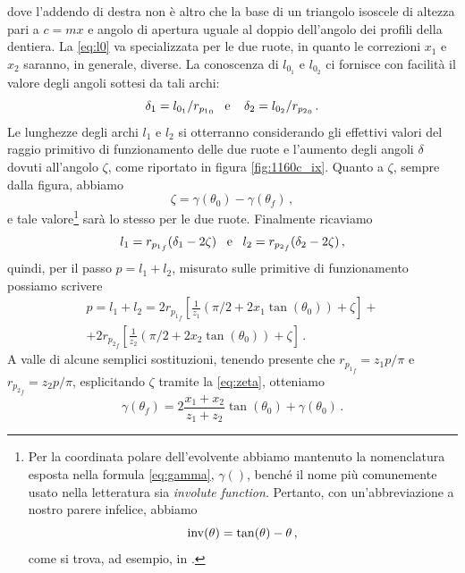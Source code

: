 \noindent dove l'addendo di destra non \`e altro che la base di un triangolo
isoscele di altezza pari a $c=mx$ e angolo di apertura uguale al 
doppio dell'angolo dei profili della dentiera. La \ref{eq:l0} va specializzata
per le due ruote, in quanto le correzioni $x_1$ e $x_2$ saranno,
in generale, 
diverse. La conoscenza di $l_{0_1}$ e $l_{0_2}$ ci fornisce con facilit\`a
il valore degli angoli sottesi da tali archi:
\begin{equation}
\delta_1 = l_{0_1}/r_{{p_1}_0}\;\;\; {\rm e} \;\;\;\;
\delta_2 = l_{0_2}/r_{{p_2}_0}\,.
\label{eq:delta}
\end{equation}
\noindent Le lunghezze degli archi $l_1$ e $l_2$ si otterranno considerando
gli effettivi valori del raggio primitivo di funzionamento delle due ruote 
e l'aumento degli angoli $\delta$ dovuti all'angolo $\zeta$, come riportato
in figura \ref{fig:1160c_ix}.
Quanto a $\zeta$, sempre dalla figura, abbiamo
\begin{equation}
\zeta= \gamma(\theta_0)-\gamma(\theta_f)\,,
\label{eq:zeta}
\end{equation}
\noindent e tale valore\footnote{
Per la coordinata polare dell'evolvente abbiamo mantenuto la nomenclatura
esposta nella formula \ref{eq:gamma}, $\gamma()$, bench\'e
il nome pi\`u comunemente usato nella letteratura sia {\em involute
function}. Pertanto, con un'abbreviazione a nostro
parere infelice, abbiamo
\begin{equation}
 {\rm inv}(\theta) = \tan(\theta)-\theta \,,
\label{eq:inv}
\end{equation}
come si trova, ad esempio, in \cite{henriot}.
} sar\`a lo stesso per le due ruote. Finalmente ricaviamo
\begin{equation}
l_1= r_{{p_1}_f} (\delta_1-2\zeta)\;\;\; {\rm e} \;\;\; l_2= r_{{p_2}_f} (\delta_2-2\zeta)\,,
\label{eq:l1l2}
\end{equation}
\noindent quindi, per il passo $p=l_1+l_2$, misurato sulle primitive di 
funzionamento possiamo scrivere
\begin{multline}
p= l_1+l_2= 
2 r_{{p_1}_f}[ \frac{1}{z_1} (\pi/2 + 2 x_1 \tan(\theta_0)) + \zeta] +\\
+2 r_{{p_2}_f}[ \frac{1}{z_2} (\pi/2 + 2 x_2 \tan(\theta_0)) + \zeta]\,.
\end{multline} 
\noindent A valle di alcune semplici sostituzioni, tenendo presente 
che $r_{{p_1}_f}= z_1 p/\pi$ e $r_{{p_2}_f}= z_2 p/\pi$,
esplicitando $\zeta$ tramite la \ref{eq:zeta}, otteniamo
\begin{equation}
\gamma(\theta_f)=2 \frac{x_1+x_2}{z_1+z_2}\tan(\theta_0) +\gamma(\theta_0)\,.
\label{eq:thetaf}
\end{equation}
